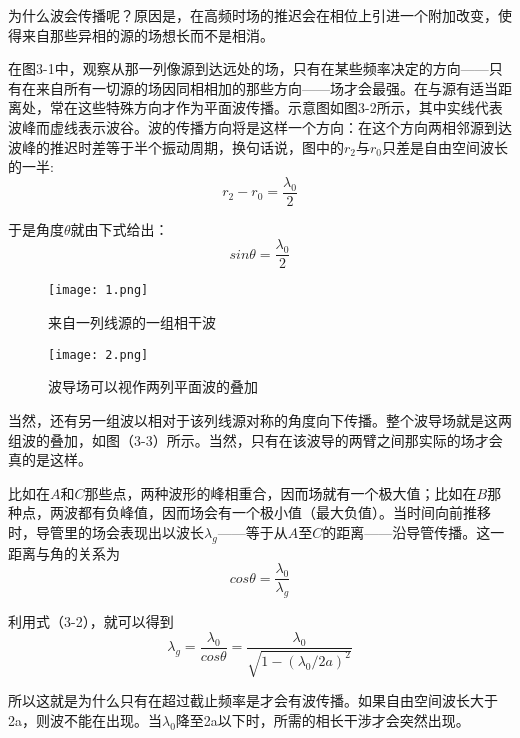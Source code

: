 \documentclass[bachelor]{thesis-uestc}
\begin{document}
为什么波会传播呢？原因是，在高频时场的推迟会在相位上引进一个附加改变，使得来自那些异相的源的场想长而不是相消。

在图3-1中，观察从那一列像源到达远处的场，只有在某些频率决定的方向——只有在来自所有一切源的场因同相相加的那些方向——场才会最强。在与源有适当距离处，常在这些特殊方向才作为平面波传播。示意图如图3-2所示，其中实线代表波峰而虚线表示波谷。波的传播方向将是这样一个方向：在这个方向两相邻源到达波峰的推迟时差等于半个振动周期，换句话说，图中的$r_2$与$r_0$只差是自由空间波长的一半:
\begin{equation}
	r_2-r_0=\frac{\lambda _0}{2}
\end{equation}

于是角度$\theta$就由下式给出：
\begin{equation}
	sin\theta=\frac{\lambda _0}{2}
\end{equation}

\begin{figure*}
\centering
\begin{minipage}[!htbp]{0.5\textwidth}
\texttt{[image: 1.png]}
\caption{来自一列线源的一组相干波}
\label{fig:side:a}
\end{minipage}%
\begin{minipage}[!htbp]{0.5\textwidth}
\centering
\texttt{[image: 2.png]}
\caption{波导场可以视作两列平面波的叠加}
\label{fig:side:b}
\end{minipage}
\end{figure*}
	
当然，还有另一组波以相对于该列线源对称的角度向下传播。整个波导场就是这两组波的叠加，如图（3-3）所示。当然，只有在该波导的两臂之间那实际的场才会真的是这样。

比如在$A$和$C$那些点，两种波形的峰相重合，因而场就有一个极大值；比如在$B$那种点，两波都有负峰值，因而场会有一个极小值（最大负值）。当时间向前推移时，导管里的场会表现出以波长$\lambda _g$——等于从$A$至$C$的距离——沿导管传播。这一距离与角的关系为
\begin{equation}
	cos\theta=\frac{\lambda _0}{\lambda _g}
\end{equation}

利用式（3-2），就可以得到
\begin{equation}
	\lambda _g=\frac{\lambda _0}{cos\theta}=\frac{\lambda _0}{\sqrt{1-{(\lambda _0/2a)^2}}}
\end{equation}

所以这就是为什么只有在超过截止频率是才会有波传播。如果自由空间波长大于2a，则波不能在出现。当$\lambda _0$降至2a以下时，所需的相长干涉才会突然出现。
\end{document}
